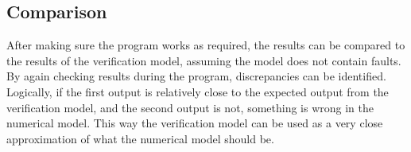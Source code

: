 \subsection{Comparison}
After making sure the program works as required, the results can be compared to the results of the verification model, assuming the model does not contain faults. By again checking results during the program, discrepancies can be identified. Logically, if the first output is relatively close to the expected output from the verification model, and the second output is not, something is wrong in the numerical model. This way the verification model can be used as a very close approximation of what the numerical model should be. 
